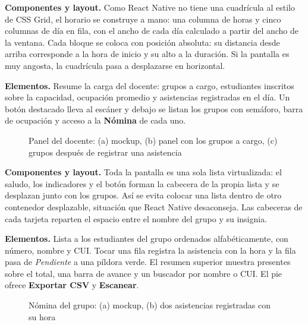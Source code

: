 \textbf{Componentes y layout.} Como React Native no tiene una cuadrícula al estilo de CSS Grid, el horario se construye a mano: una columna de horas y cinco columnas de día en fila, con el ancho de cada día calculado a partir del ancho de la ventana. Cada bloque se coloca con posición absoluta: su distancia desde arriba corresponde a la hora de inicio y su alto a la duración. Si la pantalla es muy angosta, la cuadrícula pasa a desplazarse en horizontal.


\textbf{Elementos.} Resume la carga del docente: grupos a cargo, estudiantes inscritos sobre la capacidad, ocupación promedio y asistencias registradas en el día. Un botón destacado lleva al escáner y debajo se listan los grupos con semáforo, barra de ocupación y acceso a la \textbf{Nómina} de cada uno.

\begin{figure}[!htbp]
\centering
{}
\caption{Panel del docente: (a) mockup, (b) panel con los grupos a cargo, (c) grupos después de registrar una asistencia}
\label{fig:i07}
\end{figure}

\textbf{Componentes y layout.} Toda la pantalla es una sola lista virtualizada: el saludo, los indicadores y el botón forman la cabecera de la propia lista y se desplazan junto con los grupos. Así se evita colocar una lista dentro de otro contenedor desplazable, situación que React Native desaconseja. Las cabeceras de cada tarjeta reparten el espacio entre el nombre del grupo y su insignia.


\textbf{Elementos.} Lista a los estudiantes del grupo ordenados alfabéticamente, con número, nombre y CUI. Tocar una fila registra la asistencia con la hora y la fila pasa de \textit{Pendiente} a una píldora verde. El resumen superior muestra presentes sobre el total, una barra de avance y un buscador por nombre o CUI. El pie ofrece \textbf{Exportar CSV} y \textbf{Escanear}.

\begin{figure}[!htbp]
\centering
{}
\caption{Nómina del grupo: (a) mockup, (b) dos asistencias registradas con su hora}
\label{fig:i08}
\end{figure}

